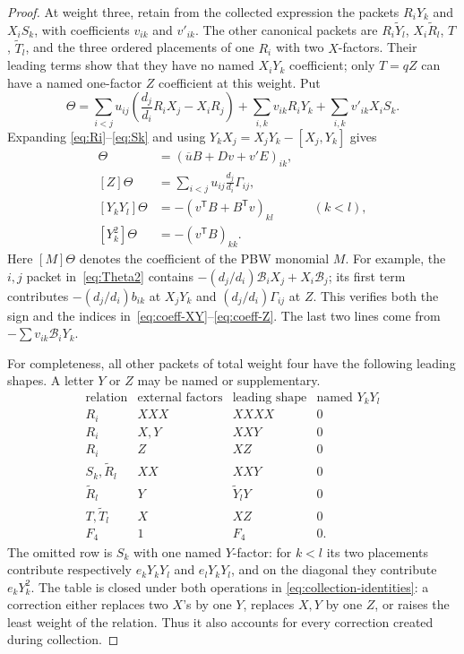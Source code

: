 \documentclass[11pt]{amsart}
\theoremstyle{remark}
\begin{document}
\begin{proof}
At weight three, retain from the collected expression the packets
$R_iY_k$ and $X_iS_k$, with coefficients $v_{ik}$ and $v'_{ik}$.
The other canonical packets are
$R_i\widetilde Y_l$, $X_i\widetilde R_l$, $T$,
$\widetilde T_l$, and the three ordered placements of one $R_i$ with
two $X$-factors.  Their leading terms show that they have no named
$X_iY_k$ coefficient; only $T=qZ$ can have a named one-factor
$Z$ coefficient at this weight.
Put
\begin{equation}\label{eq:Theta}
 \Theta=\sum_{i<j}u_{ij}
   \left(\frac{d_j}{d_i}R_iX_j-X_iR_j\right)
   +\sum_{i,k}v_{ik}R_iY_k
   +\sum_{i,k}v'_{ik}X_iS_k.
\end{equation}
Expanding
\eqref{eq:Ri}--\eqref{eq:Sk} and using
$Y_kX_j=X_jY_k-[X_j,Y_k]$ gives
\begin{align}
 [X_iY_k]\Theta&=(\overline uB+Dv+v'E)_{ik},              \label{eq:coeff-XY}\\
 [Z]\Theta&=\sum_{i<j}u_{ij}\frac{d_j}{d_i}\Gamma_{ij}, \label{eq:coeff-Z}\\
 [Y_kY_l]\Theta
   &=-(v^{\mathsf T}B+B^{\mathsf T}v)_{kl} &&(k<l),      \label{eq:coeff-YY}\\
 [Y_k^2]\Theta&=-(v^{\mathsf T}B)_{kk}.                  \label{eq:coeff-Y2}
\end{align}
Here $[M]\Theta$ denotes the coefficient of the PBW monomial $M$.
For example, the $i,j$ packet in~\eqref{eq:Theta2} contains
$-(d_j/d_i)\mathcal B_iX_j+X_i\mathcal B_j$; its first term contributes
$-(d_j/d_i)b_{ik}$ at $X_jY_k$ and
$(d_j/d_i)\Gamma_{ij}$ at $Z$.  This verifies both the sign and the
indices in~\eqref{eq:coeff-XY}--\eqref{eq:coeff-Z}.  The last two
lines come from $-\sum v_{ik}\mathcal B_iY_k$.

For completeness, all other packets of total weight four have the
following leading shapes.  A letter $Y$ or $Z$ may be named or
supplementary.
\[
\begin{array}{c|c|c|c}
 \text{relation}&\text{external factors}&\text{leading shape}
      &\text{named }Y_kY_l\\ \hline
 R_i&XXX&XXXX&0\\
 R_i&X,Y&XXY&0\\
 R_i&Z&XZ&0\\
 S_k,\widetilde R_l&XX&XXY&0\\
 \widetilde R_l&Y&\widetilde Y_lY&0\\
 T,\widetilde T_l&X&XZ&0\\
 F_4&1&F_4&0.
\end{array}
\]
The omitted row is $S_k$ with one named $Y$-factor:
for $k<l$ its two placements contribute respectively
$e_kY_kY_l$ and $e_lY_kY_l$, and on the diagonal they contribute
$e_kY_k^2$.  The table is closed under both operations in
\eqref{eq:collection-identities}: a correction either replaces two
$X$'s by one $Y$, replaces $X,Y$ by one $Z$, or raises the least
weight of the relation.  Thus it also accounts for every correction
created during collection.


\end{proof}
\end{document}
